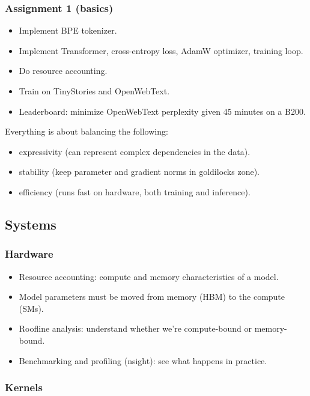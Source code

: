 \documentclass[12pt,twoside]{article}
\begin{document}
\subsubsection*{Assignment 1 (basics)}

\begin{itemize}
    \item Implement BPE tokenizer.
    \item Implement Transformer, cross-entropy loss, AdamW optimizer, training loop.
    \item Do resource accounting.
    \item Train on TinyStories and OpenWebText.
    \item Leaderboard: minimize OpenWebText perplexity given 45 minutes on a B200.
\end{itemize}

Everything is about balancing the following:

\begin{itemize}
    \item expressivity (can represent complex dependencies in the data).
    \item stability (keep parameter and gradient norms in goldilocks zone).
    \item efficiency (runs fast on hardware, both training and inference).
\end{itemize}

\subsection*{Systems}

\subsubsection*{Hardware}

\begin{itemize}
    \item Resource accounting: compute and memory characteristics of a model.
    \item Model parameters must be moved from memory (HBM) to the compute (SMs).
    \item Roofline analysis: understand whether we're compute-bound or memory-bound.
    \item Benchmarking and profiling (nsight): see what happens in practice.
\end{itemize}

\subsubsection*{Kernels}
\end{document}

